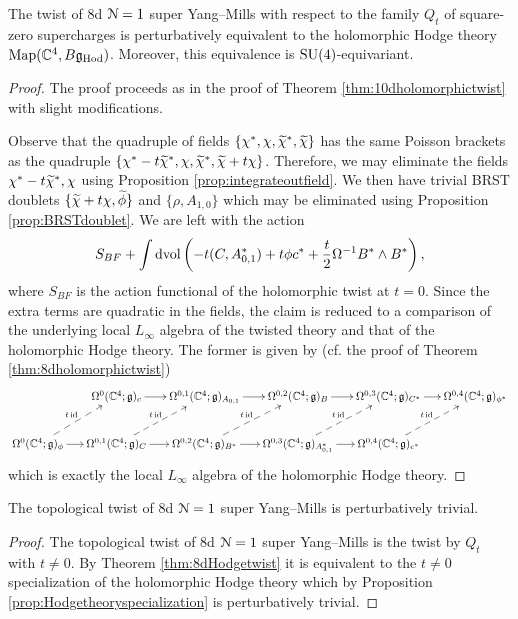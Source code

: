 \documentclass[10pt, oneside]{article}
\begin{document}
\begin{thm}
The twist of 8d $\mathcal N=1$ super Yang--Mills with respect to the family $Q_t$ of square-zero supercharges is perturbatively equivalent to the holomorphic Hodge theory $\operatorname{Map}(\mathbb C^4, B\mathfrak g_{\mathrm{Hod}})$. Moreover, this equivalence is $\mathrm{SU}(4)$-equivariant.
\label{thm:8dHodgetwist}
\end{thm}
\begin{proof}
The proof proceeds as in the proof of Theorem \ref{thm:10dholomorphictwist} with slight modifications.

Observe that the quadruple of fields $\{\chi^*, \chi, \widetilde{\chi}^*, \widetilde{\chi}\}$ has the same Poisson brackets as the quadruple $\{\chi^*-t\widetilde{\chi}^*, \chi, \widetilde{\chi}^*, \widetilde{\chi} + t\chi\}$. Therefore, we may eliminate the fields $\chi^*-t\widetilde{\chi}^*, \chi$ using Proposition \ref{prop:integrateoutfield}. We then have trivial BRST doublets $\{\widetilde{\chi} + t\chi, \widetilde{\phi}\}$ and $\{\rho, A_{1, 0}\}$ which may be eliminated using Proposition \ref{prop:BRSTdoublet}. We are left with the action
\[S_{BF} + \int\operatorname{dvol}\left(-t(C, A_{0, 1}^*) + t\phi c^* + \frac{t}{2} \Omega^{-1} B^*\wedge B^*\right),\]
where $S_{BF}$ is the action functional of the holomorphic twist at $t=0$. Since the extra terms are quadratic in the fields, the claim is reduced to a comparison of the underlying local $L_\infty$ algebra of the twisted theory and that of the holomorphic Hodge theory. The former is given by (cf. the proof of Theorem \ref{thm:8dholomorphictwist})
\[
\xymatrix@C=0.5cm{
&\Omega^0(\CC^4; \gg)_c \ar[r] &\Omega^{0,1}(\CC^4; \gg)_{A_{0,1}} \ar[r] &\Omega^{0,2}(\CC^4; \gg)_{B} \ar[r] &\Omega^{0,3}(\CC^4; \gg)_{C^*} \ar[r] &\Omega^{0,4}(\CC^4; \gg)_{\phi^*} \\
\Omega^0(\CC^4; \gg)_{\phi} \ar[r] \ar@{-->}^{t\id}[ur] & \Omega^{0,1}(\CC^4; \gg)_C \ar[r] \ar@{-->}^{t\id}[ur] &\Omega^{0,2}(\CC^4; \gg)_{B^*} \ar[r] \ar@{-->}^{t\id}[ur] &\Omega^{0,3}(\CC^4; \gg)_{A_{0,1}^*} \ar[r] \ar@{-->}^{t\id}[ur] &\Omega^{0,4}(\CC^4; \gg)_{c^*} \ar@{-->}^{t\id}[ur] &
}
\]
which is exactly the local $L_\infty$ algebra of the holomorphic Hodge theory.
\end{proof}

\begin{cor}
The topological twist of 8d $\mathcal N=1$ super Yang--Mills is perturbatively trivial.
\label{cor:8dtopologicaltwist}
\end{cor}
\begin{proof}
The topological twist of 8d $\mathcal N=1$ super Yang--Mills is the twist by $Q_t$ with $t\neq 0$. By Theorem \ref{thm:8dHodgetwist} it is equivalent to the $t\neq 0$ specialization of the holomorphic Hodge theory which by Proposition \ref{prop:Hodgetheoryspecialization} is perturbatively trivial.
\end{proof}
\end{document}
